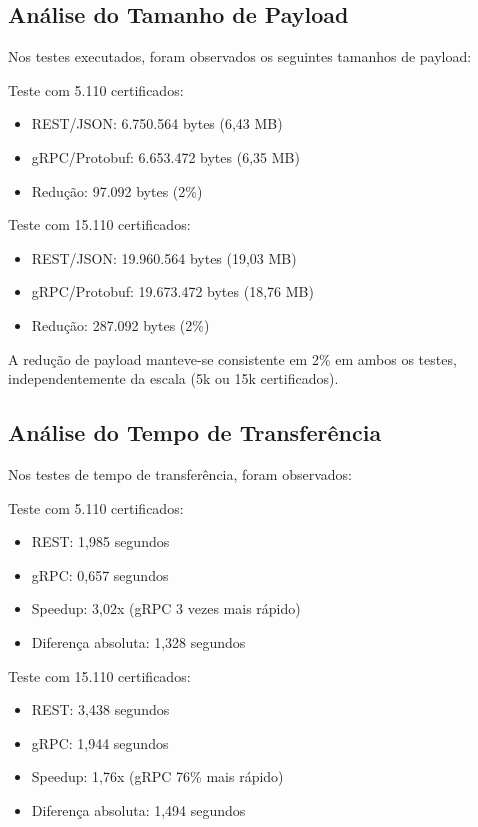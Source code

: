 \subsection{Análise do Tamanho de Payload}

Nos testes executados, foram observados os seguintes tamanhos de payload:

Teste com 5.110 certificados:
\begin{itemize}
    \item REST/JSON: 6.750.564 bytes (6,43 MB)
    \item gRPC/Protobuf: 6.653.472 bytes (6,35 MB)
    \item Redução: 97.092 bytes (2\%)
\end{itemize}

Teste com 15.110 certificados:
\begin{itemize}
    \item REST/JSON: 19.960.564 bytes (19,03 MB)
    \item gRPC/Protobuf: 19.673.472 bytes (18,76 MB)
    \item Redução: 287.092 bytes (2\%)
\end{itemize}

A redução de payload manteve-se consistente em 2\% em ambos os testes, independentemente da escala (5k ou 15k certificados).

\subsection{Análise do Tempo de Transferência}

Nos testes de tempo de transferência, foram observados:

Teste com 5.110 certificados:
\begin{itemize}
    \item REST: 1,985 segundos
    \item gRPC: 0,657 segundos
    \item Speedup: 3,02x (gRPC 3 vezes mais rápido)
    \item Diferença absoluta: 1,328 segundos
\end{itemize}

Teste com 15.110 certificados:
\begin{itemize}
    \item REST: 3,438 segundos
    \item gRPC: 1,944 segundos
    \item Speedup: 1,76x (gRPC 76\% mais rápido)
    \item Diferença absoluta: 1,494 segundos
\end{itemize}

